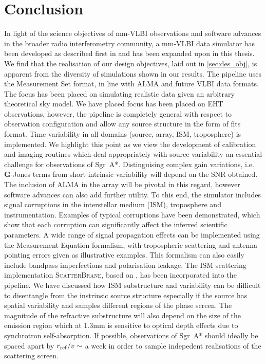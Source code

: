 \chapter{Conclusion} %

In light of the science objectives of mm-VLBI observations and software advances in the broader radio interferometry community, a mm-VLBI data simulator has been developed as described first in \citet{Blecher_2016} and has been expanded upon in this thesis.
We find that the realisation of our design objectives, laid out in \ref{sec:des_obj}, is apparent from the diversity of simulations shown in our results. 
The pipeline uses the {\sc Measurement Set} format, in line with ALMA and future VLBI data formats. The focus has been placed on simulating realistic data given an arbitrary theoretical sky model. 
We have placed focus has been placed on EHT observations, however, the pipeline is completely general with respect to observation configuration and allow any source structure in the form of {\sc fits} format. 
Time variability in all domains (source, array, ISM, troposphere) is implemented. We highlight this point as we view the development of calibration and imaging routines which deal appropriately with source variability an essential challenge for observations of Sgr~A*. Distinguising complex gain variations, i.e. $\bm G$-Jones terms from short intrinsic variability will depend on the SNR obtained. The inclusion of ALMA in the array will be pivotal in this regard, however software advances can also add further utility.
To this end, the simulator includes signal corruptions in the interstellar medium (ISM), troposphere and instrumentation. Examples of typical corruptions have been demonstrated, which show that each corruption can significantly affect the inferred scientific parameters. A wide range of signal propagation effects can be implemented using the Measurement Equation formalism, with tropospheric scattering and antenna pointing errors given as illustrative examples. This formalism can also easily include bandpass imperfections and polarisation leakage.
The ISM scattering implementation \textsc{ScatterBrane}, based on \citet*{Johnson_2015a}, has been incorporated into the pipeline. We have discussed how ISM substructure and variability can be difficult to disentangle from the instrinsic source structure especially if the source has spatial variability and samples different regions of the phase screen. The magnitude of the refractive substructure will also depend on the size of the emission region which at 1.3mm is sensitive to optical depth effects due to synchrotron self-absorption. If possible, observations of Sgr~A* should ideally be spaced apart by $r_{\rm ref}/v \sim$ a week  in order to sample indepedent realisations of the scattering screen. 


